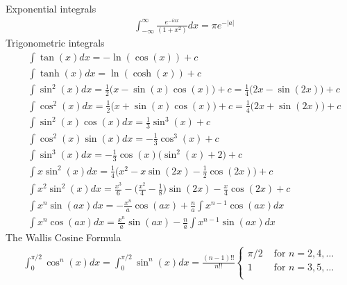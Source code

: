 Exponential integrals
\begin{align}
	&\int_{-\infty}^{\infty} \frac{e^{-iax}}{(1+x^2)}dx = \pi e^{-|a|}
\end{align}
Trigonometric integrals 
\begin{align}
	&\int \tan(x)dx = -\ln(\cos(x)) +c\\
	&\int \tanh(x)dx = \ln(\cosh(x))+c \\
	&\int \sin^2(x)dx = \frac{1}{2}\big(x-\sin(x)\cos(x)\big)+c = \frac{1}{4}\big(2x-\sin(2x)\big)+c\\
	&\int \cos^2(x)dx = \frac{1}{2}\big(x+\sin(x)\cos(x)\big)+c = \frac{1}{4}\big(2x+\sin(2x)\big)+c \\
	&\int \sin^2(x)\cos(x)dx = \frac{1}{3}\sin^3(x)+c \\
	&\int \cos^2(x)\sin(x)dx = -\frac{1}{3}\cos^3(x)+c \\
	&\int \sin^3(x)dx = -\frac{1}{3}\cos(x)\big(\sin^2(x)+2\big)+c \\
	&\int x\sin^2(x)dx = \frac{1}{4}\big(x^2-x\sin(2x)-\frac{1}{2}\cos(2x)\big)+c\\
	&\int x^2\sin^2(x)dx =\frac{x^3}{6}-\bigg(\frac{x^2}{4}-\frac{1}{8}\bigg)\sin(2x)-\frac{x}{4}\cos(2x)+c \\
	&\int x^n \sin(ax)dx = -\frac{x^n}{a}\cos(ax)+ \frac{n}{a}\int x^{n-1}\cos(ax)dx \\
	&\int x^n \cos(ax)dx = \frac{x^n}{a}\sin(ax)- \frac{n}{a}\int x^{n-1}\sin(ax)dx		
\end{align}
The Wallis Cosine Formula
\begin{align}
\int_{0}^{\pi/2}\cos^n(x) dx = \int_{0}^{\pi/2}\sin^n(x) dx = \frac{(n-1)!!}{n!!}
\begin{cases}
\pi/2 &\textrm{ for } n=2,4,\dots\\
1 &\textrm{ for } n=3,5,\dots\\
\end{cases}
\end{align}




\newpage

